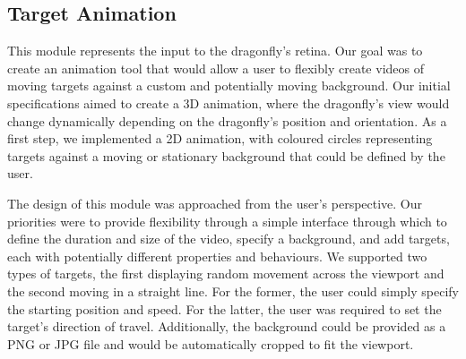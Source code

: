 \documentclass[a4paper,11pt]{article}
\begin{document}
\subsection{Target Animation}
This module represents the input to the dragonfly's retina. Our goal was to create an animation tool that would allow a user to flexibly create videos of moving targets against a custom and potentially moving background. Our initial specifications aimed to create a 3D animation, where the dragonfly's view would change dynamically depending on the dragonfly's position and orientation. As a first step, we implemented a 2D animation, with coloured circles representing targets against a moving or stationary background that could be defined by the user.

The design of this module was approached from the user's perspective. Our priorities were to provide flexibility through a simple interface through which to define the duration and size of the video, specify a background, and add targets, each with potentially different properties and behaviours. We supported two types of targets, the first displaying random movement across the viewport and the second moving in a straight line. For the former, the user could simply specify the starting position and speed. For the latter, the user was required to set the target's direction of travel. Additionally, the background could be provided as a PNG or JPG file and would be automatically cropped to fit the viewport.
\end{document}
